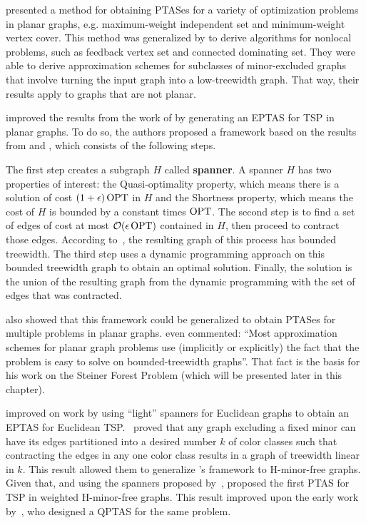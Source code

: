 \cite{baker1994} presented a method for obtaining PTASes for a variety of optimization problems in planar graphs, e.g. maximum-weight independent set and minimum-weight vertex cover. This method was generalized by \cite{demaine2005} to derive algorithms for nonlocal problems, such as feedback vertex set and connected dominating set. They were able to derive approximation schemes for subclasses of minor-excluded graphs that involve turning the input graph into a low-treewidth graph. That way, their results apply to graphs that are not planar.

\cite{KleinTSP} improved the results from the work of \cite{basicPTASplanarTSP} by generating an EPTAS for TSP in planar graphs. 
To do so, the authors proposed a framework based on the results from \cite{baker1994} and \cite{demaine2005}, which consists of the following steps.

The first step creates a subgraph \(H\) called \textbf{spanner}.
A spanner \(H\) has two properties of interest: the Quasi-optimality property, which means there is a solution of cost \((1 + \epsilon) \operatorname{\textrm{OPT}}\) in \(H\) and the Shortness property, which means the cost of \(H\) is bounded by a constant times \(\operatorname{\textrm{OPT}}\). The second step is to find a set of edges of cost at most \(\mathcal{O}(\epsilon \operatorname{\textrm{OPT}})\) contained in \(H\), then proceed to contract those edges. According to~\cite{Demaine2010}, the resulting graph of this process has bounded treewidth. The third step uses a dynamic programming approach on this bounded treewidth graph to obtain an optimal solution. Finally, the solution is the union of the resulting graph from the dynamic programming with the set of edges that was contracted.

\cite{KleinTSP} also showed that this framework could be generalized to obtain PTASes for multiple problems in planar graphs. \cite{Bateni} even commented: ``Most approximation schemes for planar graph problems use (implicitly or explicitly) the fact that the problem is easy to solve on bounded-treewidth graphs''. That fact is the basis for his work on the Steiner Forest Problem (which will be presented later in this chapter).

\cite{EPTASeuclidianTSP} improved on \cite{PTASeuclidianTSP} work by using ``light'' spanners for Euclidean graphs to obtain an EPTAS for Euclidean TSP.~\cite{contraction-decomposition-in-h-minor-free-graphs} proved that any graph excluding a fixed minor can have its edges partitioned into a desired number \(k\) of color classes such that contracting the edges in any one color class results in a graph of treewidth linear in \(k\). This result allowed them to generalize \citeauthor{KleinTSP}'s framework to H-minor-free graphs. Given that, and using the spanners proposed by~\cite{light_spanners_tsp}, \citeauthor{contraction-decomposition-in-h-minor-free-graphs} proposed the first PTAS for TSP in weighted H-minor-free graphs. This result improved upon the early work by~\cite{light_spanners_tsp}, who designed a QPTAS for the same problem.

